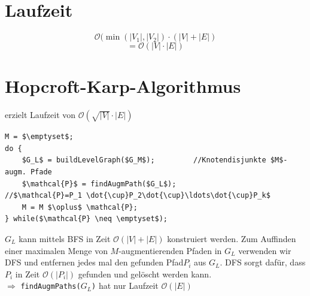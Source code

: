  \section{Laufzeit}
 \[ \mathcal{O}(\min(|V_1|,|V_2|)\cdot(|V|+|E|) \]
 \[ =\mathcal{O}(|V|\cdot|E|) \]
 \section{Hopcroft-Karp-Algorithmus}
 erzielt Laufzeit von $\mathcal{O}(\sqrt{|V|}\cdot |E|)$\\
 \begin{lstlisting}
M = $\emptyset$;
do {
	$G_L$ = buildLevelGraph($G_M$);			//Knotendisjunkte $M$-augm. Pfade
	$\mathcal{P}$ = findAugmPath($G_L$);				//$\mathcal{P}=P_1 \dot{\cup}P_2\dot{\cup}\ldots\dot{\cup}P_k$
	M = M $\oplus$ \mathcal{P};
} while($\mathcal{P} \neq \emptyset$);
 \end{lstlisting}
 $G_L$ kann mittels BFS in Zeit $\mathcal{O} (|V|+|E|)$ konstruiert werden. Zum Auffinden einer maximalen Menge von $M$-augmentierenden Pfaden in $G_L$ verwenden wir DFS und entfernen jedes mal den gefunden Pfad$P_i$ aus $G_L$. DFS sorgt dafür, dass $P_i$ in Zeit $\mathcal{O}(|P_i|)$ gefunden und gelöscht werden kann.\\
 $\Rightarrow$ \texttt{findAugmPaths($G_L$)} hat nur Laufzeit $\mathcal{O}(|E|)$